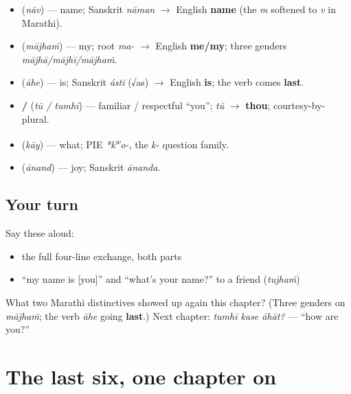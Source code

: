 \begin{grammarlens}[title={What you've built — atoms banked this chapter}]
\begin{itemize}
\raggedright
  \item \textbf{} (\emph{nāv}) — name; Sanskrit \emph{nāman} $\to$ English \textbf{name} (the \emph{m} softened to \emph{v} in Marathi).
  \item \textbf{} (\emph{mājhaṁ}) — my; root \emph{ma-} $\to$ English \textbf{me/my}; three genders \emph{mājhā/mājhī/mājhaṁ}.
  \item \textbf{} (\emph{āhe}) — is; Sanskrit \emph{ásti} (√as) $\to$ English \textbf{is}; the verb comes \textbf{last}.
  \item \textbf{ / } (\emph{tū / tumhī}) — familiar / respectful \textquotedblleft{}you\textquotedblright{}; \emph{tū} $\to$ \textbf{thou}; courtesy-by-plural.
  \item \textbf{} (\emph{kāy}) — what; PIE \emph{*k\textsuperscript{w}o-}, the \emph{k-} question family.
  \item \textbf{} (\emph{ānand}) — joy; Sanskrit \emph{ānanda}.
\end{itemize}
\end{grammarlens}

\subsection*{Your turn}
Say these aloud:

\begin{itemize}
\raggedright
  \item the full four-line exchange, both parts
  \item \textquotedblleft{}my name is {[}you{]}\textquotedblright{} and \textquotedblleft{}what's your name?\textquotedblright{} to a friend (\emph{tujhaṁ})
\end{itemize}

\begin{tcolorbox}[breakable,colback=teal!4,colframe=teal!35!black,title={Before you move on}]
What two Marathi distinctives showed up again this chapter? (Three genders on \emph{mājhaṁ}; the verb \emph{āhe} going \textbf{last}.) Next chapter: \emph{tumhī kase āhāt?} — \textquotedblleft{}how are you?\textquotedblright{}
\end{tcolorbox}
\section[last six (śevaṭce sahā)]{The last six, one chapter on}

